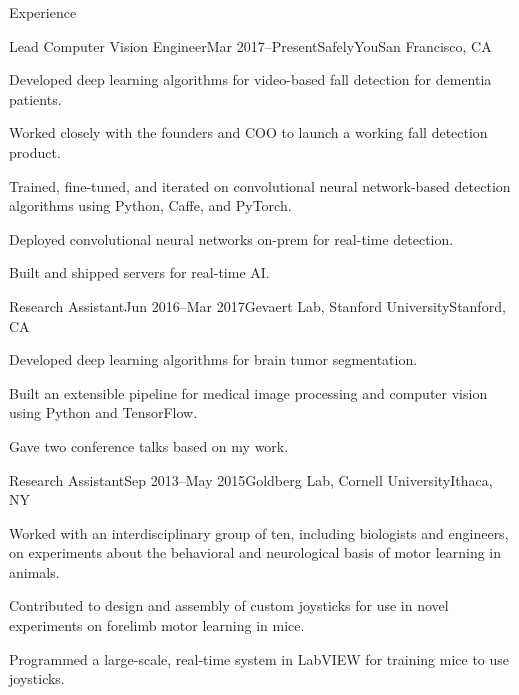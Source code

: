 \documentclass{resume}
\begin{document}
\begin{rSection}{Experience}

    \begin{rExperience}{Lead Computer Vision Engineer}{Mar 2017--Present}{SafelyYou}{San Francisco, CA}
        \item Developed deep learning algorithms for video-based fall detection for dementia patients.
        \item Worked closely with the founders and COO to launch a working fall detection product.
        \item Trained, fine-tuned, and iterated on convolutional neural network-based detection algorithms using Python, Caffe, and PyTorch.
        \item Deployed convolutional neural networks on-prem for real-time detection.
        \item Built and shipped servers for real-time AI.
    \end{rExperience}
    
    \begin{rExperience}{Research Assistant}{Jun 2016--Mar 2017}{Gevaert Lab, Stanford University}{Stanford, CA}
        \item Developed deep learning algorithms for brain tumor segmentation.
        \item Built an extensible pipeline for medical image processing and computer vision using Python and TensorFlow.
        \item Gave two conference talks based on my work.
    \end{rExperience}


    \begin{rExperience}{Research Assistant}{Sep 2013--May 2015}{Goldberg Lab, Cornell University}{Ithaca, NY}
        \item Worked with an interdisciplinary group of ten, including biologists and engineers, on experiments about the behavioral and neurological basis of motor learning in animals.
        \item Contributed to design and assembly of custom joysticks for use in novel experiments on forelimb motor learning in mice.
        \item Programmed a large-scale, real-time system in LabVIEW for training mice to use joysticks.
    \end{rExperience}


\end{rSection}
\end{document}
